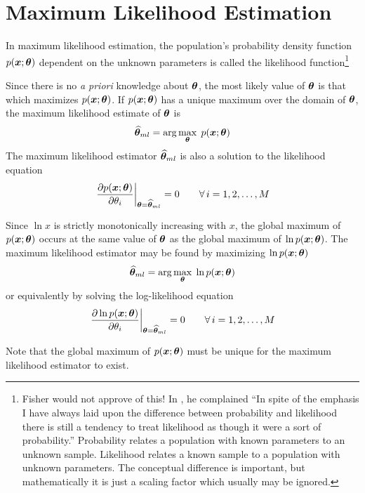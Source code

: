 \section{Maximum Likelihood Estimation}

In maximum likelihood estimation, the population's probability density 
function $p(\bm{x};\bm{\theta})$ dependent on the unknown parameters is called the likelihood
function\footnote{Fisher would not approve of this!  In \protect\cite{Fis30},
he complained ``In spite of the emphasis I have always laid upon the
difference between probability and likelihood there is still a tendency to
treat likelihood as though it were a sort of probability.'' Probability
relates a population with known parameters to an unknown sample.  Likelihood
relates a known sample to a population with unknown parameters.  The
conceptual difference is important, but mathematically it is just a scaling 
factor which usually may be ignored.}

Since there is no {\em a priori\/} knowledge about $\bm{\theta}$, the most likely 
value of $\bm{\theta}$ is that which maximizes $p(\bm{x};\bm{\theta})$.  If $p(\bm{x};\bm{\theta})$ 
has a unique maximum over the domain of $\bm{\theta}$, the maximum likelihood 
estimate of $\bm{\theta}$ is
\begin{equation}
\widehat{\bm{\theta}}_{ml}=\arg\max_{\bm{\theta}}\;p(\bm{x};\bm{\theta})
\end{equation}
The maximum likelihood estimator $\widehat{\bm{\theta}}_{ml}$ is also a solution to the 
likelihood equation
\begin{equation}
\left.\frac{{\partial} p(\bm{x};\bm{\theta})}{{\partial}\theta_{i}}\right|_{\bm{\theta}=\widehat{\bm{\theta}}_{ml}}=0
\qquad\forall\, i=1,2,\ldots, M
\end{equation}

Since $\ln x$ is strictly monotonically increasing with $x$, the global 
maximum of $p(\bm{x};\bm{\theta})$ occurs at the same value of $\bm{\theta}$ as the
global maximum of $\ln p(\bm{x};\bm{\theta})$.  The maximum likelihood estimator may
be found by maximizing $\ln p(\bm{x};\bm{\theta})$
\begin{equation}
\widehat{\bm{\theta}}_{ml}=\arg\max_{\bm{\theta}}\;\ln p(\bm{x};\bm{\theta})
\end{equation}
or equivalently by solving the log-likelihood equation
\begin{equation}
\left.\frac{{\partial}\ln p(\bm{x};\bm{\theta})}{{\partial}\theta_{i}}\right|_{\bm{\theta}=\widehat{\bm{\theta}}_{ml}}=0
\qquad\forall\, i=1,2,\ldots, M
\end{equation}

Note that the global maximum of $p(\bm{x};\bm{\theta})$ must be unique for the
maximum likelihood estimator to exist.

